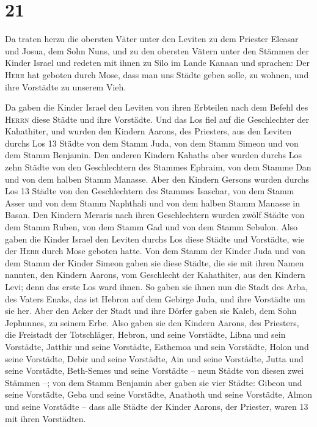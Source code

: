 \hypertarget{section-20}{%
\section{21}\label{section-20}}

 Da traten herzu die obersten Väter unter den Leviten zu
dem Priester Eleasar und Josua, dem Sohn Nuns, und zu den obersten
Vätern unter den Stämmen der Kinder Israel  und redeten
mit ihnen zu Silo im Lande Kanaan und sprachen: Der \textsc{Herr} hat
geboten durch Mose, dass man uns Städte geben solle, zu wohnen, und ihre
Vorstädte zu unserem Vieh.

 Da gaben die Kinder Israel den Leviten von ihren
Erbteilen nach dem Befehl des \textsc{Herrn} diese Städte und ihre
Vorstädte.  Und das Los fiel auf die Geschlechter der
Kahathiter, und wurden den Kindern Aarons, des Priesters, aus den
Leviten durchs Los 13 Städte von dem Stamm Juda, von dem Stamm Simeon
und von dem Stamm Benjamin.  Den anderen Kindern Kahaths
aber wurden durchs Los zehn Städte von den Geschlechtern des Stammes
Ephraim, von dem Stamme Dan und von dem halben Stamm Manasse.
 Aber den Kindern Gersons wurden durchs Los 13 Städte von
den Geschlechtern des Stammes Isaschar, von dem Stamm Asser und von dem
Stamm Naphthali und von dem halben Stamm Manasse in Basan.
 Den Kindern Meraris nach ihren Geschlechtern wurden zwölf
Städte von dem Stamm Ruben, von dem Stamm Gad und von dem Stamm Sebulon.
 Also gaben die Kinder Israel den Leviten durchs Los diese
Städte und Vorstädte, wie der \textsc{Herr} durch Mose geboten hatte.
 Von dem Stamm der Kinder Juda und von dem Stamm der
Kinder Simeon gaben sie diese Städte, die sie mit ihren Namen nannten,
 den Kindern Aarons, vom Geschlecht der Kahathiter, aus
den Kindern Levi; denn das erste Los ward ihnen.  So
gaben sie ihnen nun die Stadt des Arba, des Vaters Enaks, das ist Hebron
auf dem Gebirge Juda, und ihre Vorstädte um sie her. 
Aber den Acker der Stadt und ihre Dörfer gaben sie Kaleb, dem Sohn
Jephunnes, zu seinem Erbe.  Also gaben sie den Kindern
Aarons, des Priesters, die Freistadt der Totschläger, Hebron, und seine
Vorstädte, Libna und sein Vorstädte,  Jatthir und seine
Vorstädte, Esthemoa und sein Vorstädte,  Holon und seine
Vorstädte, Debir und seine Vorstädte,  Ain und seine
Vorstädte, Jutta und seine Vorstädte, Beth-Semes und seine Vorstädte --
neun Städte von diesen zwei Stämmen --;  von dem Stamm
Benjamin aber gaben sie vier Städte: Gibeon und seine Vorstädte, Geba
und seine Vorstädte,  Anathoth und seine Vorstädte, Almon
und seine Vorstädte --  dass alle Städte der Kinder
Aarons, der Priester, waren 13 mit ihren Vorstädten.

